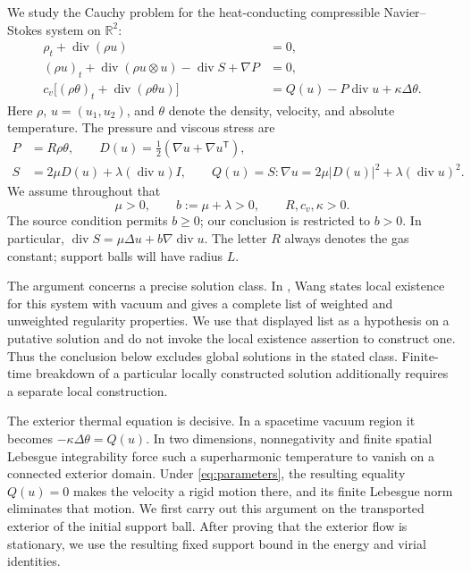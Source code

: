 \documentclass[11pt,letterpaper]{article}
\numberwithin{equation}{section}
\theoremstyle{definition}
\newcommand{\R}{\mathbb R}
\newcommand{\Div}{\operatorname{div}}
\begin{document}
We study the Cauchy problem for the heat-conducting compressible
Navier--Stokes system on $\R^2$:
\begin{align}
 \rho_t+\Div(\rho u)&=0,\label{eq:mass}\\
 (\rho u)_t+\Div(\rho u\otimes u)-\Div S+\nabla P&=0,
 \label{eq:momentum}\\
 c_v\bigl[(\rho\theta)_t+\Div(\rho\theta u)\bigr]
 &=Q(u)-P\Div u+\kappa\Delta\theta.\label{eq:thermal}
\end{align}
Here $\rho$, $u=(u_1,u_2)$, and $\theta$ denote the density, velocity,
and absolute temperature. The pressure and viscous stress are
\begin{equation}
 \begin{aligned}
 P&=R\rho\theta,\qquad
 D(u)=\tfrac12(\nabla u+\nabla u^{\mathsf T}),\\
 S&=2\mu D(u)+\lambda(\Div u)I,\qquad
 Q(u)=S:\nabla u
       =2\mu|D(u)|^2+\lambda(\Div u)^2.
 \end{aligned}\label{eq:stress}
\end{equation}
We assume throughout that
\begin{equation}
 \mu>0,\qquad b:=\mu+\lambda>0,\qquad R,c_v,\kappa>0.
 \label{eq:parameters}
\end{equation}
The source condition \cite[(1.2)]{WangV3} permits $b\ge0$;
our conclusion is restricted to $b>0$.
In particular, $\Div S=\mu\Delta u+b\nabla\Div u$. The letter $R$
always denotes the gas constant; support balls will have radius $L$.

The argument concerns a precise solution class. In
\cite[Theorem 1.1]{WangV3}, Wang states local existence for this system
with vacuum and gives a complete list of weighted and unweighted
regularity properties. We use that displayed list as a hypothesis on
a putative solution and do not invoke the local existence assertion
to construct one. Thus the conclusion below excludes global
solutions in the stated class. Finite-time breakdown of a particular
locally constructed solution additionally requires a separate local
construction.

The exterior thermal equation is decisive. In a spacetime vacuum
region it becomes $-\kappa\Delta\theta=Q(u)$. In two dimensions,
nonnegativity and finite spatial Lebesgue integrability force such a
superharmonic temperature to vanish on a connected exterior domain.
Under \eqref{eq:parameters}, the resulting equality $Q(u)=0$ makes the
velocity a rigid motion there, and its finite Lebesgue norm eliminates
that motion. We first carry out this argument on the transported
exterior of the initial support ball. After proving that the exterior
flow is stationary, we use the resulting fixed support bound in the
energy and virial identities.
\end{document}
